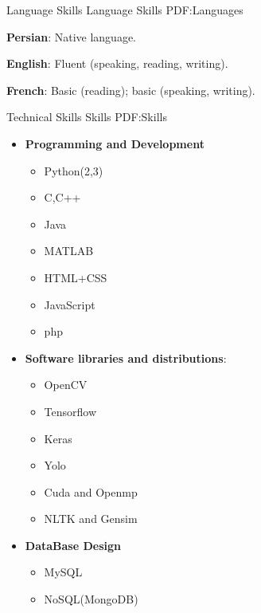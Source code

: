\documentclass[letterpaper,MMMyyyy,nonstopmode]{simpleresumecv}
\begin{document}
\begin{Body}





\Section
{Language Skills}
{Language Skills}
{PDF:Languages}

\BulletItem
\textbf{Persian}: Native language.

\Gap
\BulletItem
\textbf {English}: Fluent (speaking, reading, writing).

\Gap
\BulletItem
\textbf{French}: Basic (reading); basic (speaking, writing).


\Section
{Technical Skills}
{Skills}
{PDF:Skills}

\Entry

\begin{itemize}
\item \textbf {Programming and Development}
\begin{itemize}
    \item Python(2,3)
    \item C,C++
    \item Java
    \item MATLAB
    \item HTML+CSS
    \item JavaScript
    \item php
    
\end{itemize}



    \item \textbf{ Software libraries and distributions}: 
    \begin{itemize}
        \item OpenCV
        \item Tensorflow
        \item Keras
        \item Yolo
        \item Cuda and Openmp
        \item NLTK and Gensim
    \end{itemize}
     


\item \textbf {DataBase Design}
\begin{itemize}
     \item MySQL
     \item NoSQL(MongoDB)


\end{itemize}
\end{itemize}
\end{Body}
\end{document}
